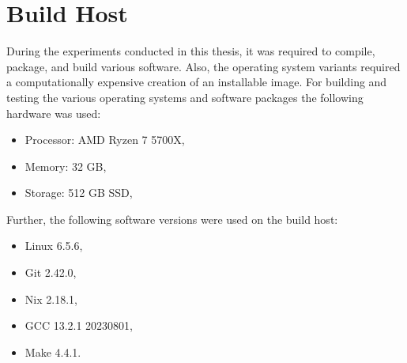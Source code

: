 \section{Build Host}
During the experiments conducted in this thesis, it was
required to compile, package, and build various software.
Also, the operating system variants required a
computationally expensive creation of an installable image.
For building and testing the various operating systems and
software packages the following hardware was used:
\begin{itemize}
    \item Processor: AMD Ryzen 7 5700X,
    \item Memory: 32 GB,
    \item Storage: 512 GB SSD,
\end{itemize}

Further, the following software versions were used on the build host:
\begin{itemize}
    \item Linux 6.5.6,
    \item Git 2.42.0,
    \item Nix 2.18.1,
    \item GCC 13.2.1 20230801,
    \item Make 4.4.1.
\end{itemize}
